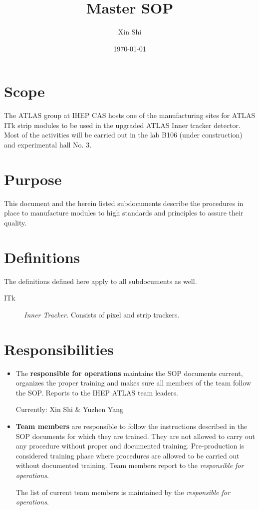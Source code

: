 \documentclass[12pt]{cnihepsop}
\title{Master SOP}
\date{\today}
\author{Xin Shi}
\begin{document}
\maketitle

\section{Scope}

The ATLAS group at IHEP CAS hosts one of the manufacturing sites for ATLAS ITk strip modules to be used in the upgraded ATLAS Inner tracker detector. Most of the activities will be carried out in the lab B106 (under construction) and experimental hall No. 3. 


\section{Purpose}
This document and the herein listed subdocuments describe the procedures in place to manufacture modules to high standards and principles to assure their quality.

\section{Definitions}
The definitions defined here apply to all subdocuments as well.
\begin{description}
    \item[ITk] \emph{Inner Tracker.} Consists of pixel and strip trackers. 
\end{description}

\section{Responsibilities}
\begin{itemize}
    \item The \textbf{responsible for operations} maintains the SOP documents current, organizes the proper training and makes sure all members of the team follow the SOP. Reports to the IHEP ATLAS team leaders. 

    Currently: Xin Shi \& Yuzhen Yang 
    \item \textbf{Team members} are responsible to follow the instructions described in the SOP documents for which they are trained. They are not allowed to carry out any procedure without proper and documented training. Pre-production is considered training phase where procedures are allowed to be carried out without documented training. Team members report to the \emph{responsible for operations}.

    The list of current team members is maintained by the \emph{responsible for operations}.
\end{itemize}
\end{document}
